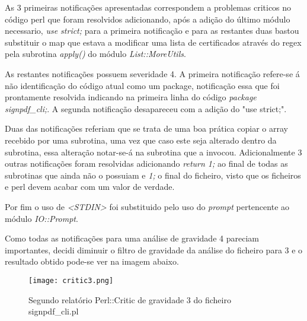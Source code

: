\par As 3 primeiras notificações apresentadas correspondem a problemas criticos no código perl que foram resolvidos adicionando, após a adição do último módulo necessario, \textit{use strict;} para a primeira notificação e para as restantes duas bastou substituir o map que estava a modificar uma lista de certificados através do regex pela subrotina \textit{apply()} do módulo \textit{List::MoreUtils}. 
\par As restantes notificações possuem severidade 4. A primeira notificação refere-se á não identificação do código atual como um package, notificação essa que foi prontamente resolvida indicando na primeira linha do código \textit{package signpdf\_cli;}. A segunda notificação desapareceu com a adição do "use strict;".
\par Duas das notificações referiam que se trata de uma boa prática copiar o array recebido por uma subrotina, uma vez que caso este seja alterado dentro da subrotina, essa alteração notar-se-á na subrotina que a invocou. Adicionalmente 3 outras notificações foram resolvidas adicionando \textit{return 1;} ao final de todas as subrotinas que ainda não o possuiam e \textit{1;} o final do ficheiro, visto que os ficheiros e perl devem acabar com um valor de verdade.
\par Por fim o uso de \textit{<STDIN>} foi substituido pelo uso do \textit{prompt} pertencente ao módulo \textit{IO::Prompt}.

Como todas as notificações para uma análise de gravidade 4 pareciam importantes, decidi diminuir o filtro de gravidade da análise do ficheiro para 3 e o resultado obtido pode-se ver na imagem abaixo.

\begin{figure}[H]

  \centering
  \captionsetup{justification=centering}

  \texttt{[image: critic3.png]}
  
  \caption {Segundo relatório Perl::Critic de gravidade 3 do ficheiro signpdf\_cli.pl}

\end{figure}

